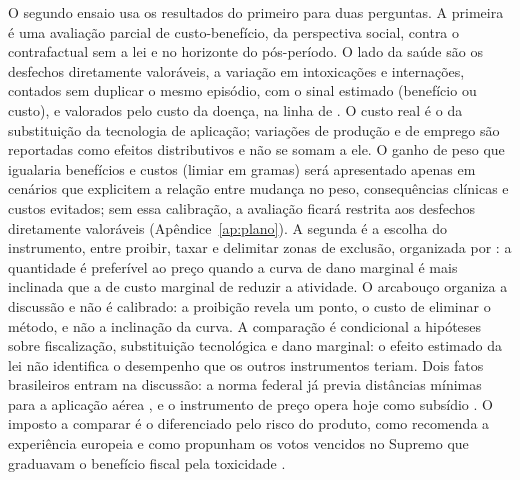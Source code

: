 O segundo ensaio usa os resultados do primeiro para duas perguntas. A primeira é
uma avaliação parcial de custo-benefício, da perspectiva social, contra o
contrafactual sem a lei e no horizonte do pós-período. O lado da saúde são os desfechos diretamente valoráveis, a variação em
intoxicações e internações, contados sem duplicar o mesmo episódio, com o sinal estimado (benefício ou
custo), e valorados pelo custo da doença, na linha de
. O custo real é o da substituição da
tecnologia de aplicação; variações de produção e de emprego são reportadas como
efeitos distributivos e não se somam a ele. O ganho de peso que igualaria benefícios e custos (limiar em gramas) será
apresentado apenas em cenários que explicitem a relação entre mudança no peso,
consequências clínicas e custos evitados; sem essa calibração, a avaliação
ficará restrita aos desfechos diretamente valoráveis
(Apêndice~\ref{ap:plano}). A segunda é a escolha do
instrumento, entre proibir, taxar e delimitar zonas de exclusão, organizada por
: a quantidade é preferível ao preço quando a curva
de dano marginal é mais inclinada que a de custo marginal de reduzir a
atividade. O arcabouço organiza a discussão e não é calibrado: a proibição
revela um ponto, o custo de eliminar o método, e não a inclinação da curva. A comparação é condicional a hipóteses sobre
fiscalização, substituição tecnológica e dano marginal: o efeito estimado da
lei não identifica o desempenho que os outros instrumentos teriam. Dois fatos brasileiros entram na discussão: a norma
federal já previa distâncias mínimas para a aplicação aérea
\cite{mapa2008in2}, e o instrumento de
preço opera hoje como subsídio \cite{cunha2020incentivos}. O imposto a
comparar é o diferenciado pelo risco do produto, como recomenda a experiência
europeia \cite{finger2017taxation} e como propunham os votos vencidos no
Supremo que graduavam o benefício fiscal pela toxicidade
\cite{stf2025adi5553}.
